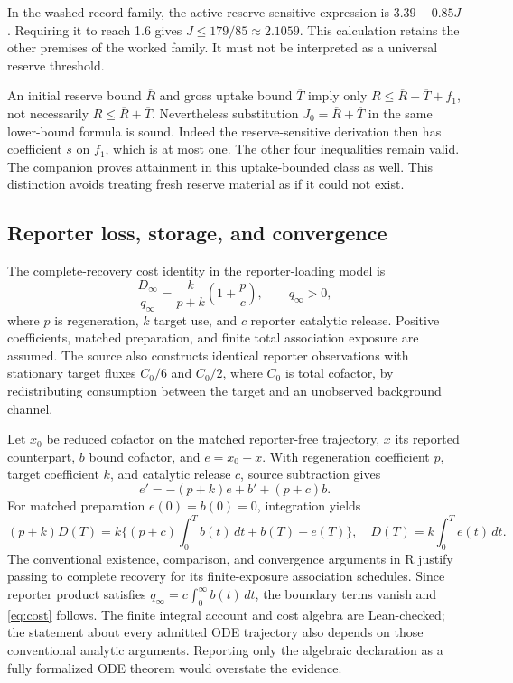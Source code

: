 In the washed record family, the active reserve-sensitive expression is $3.39-0.85J$. Requiring it to reach 1.6 gives $J\le179/85\approx2.1059$. This calculation retains the other premises of the worked family. It must not be interpreted as a universal reserve threshold.

An initial reserve bound $\overline R$ and gross uptake bound $\overline T$ imply only $R\le\overline R+\overline T+f_1$, not necessarily $R\le\overline R+\overline T$. Nevertheless substitution $J_0=\overline R+\overline T$ in the same lower-bound formula is sound. Indeed the reserve-sensitive derivation then has coefficient $s$ on $f_1$, which is at most one. The other four inequalities remain valid. The companion proves attainment in this uptake-bounded class as well. This distinction avoids treating fresh reserve material as if it could not exist.

\subsection{Reporter loss, storage, and convergence}\label{app:reporter}
The complete-recovery cost identity in the reporter-loading model is
\begin{equation}\label{eq:cost}
\frac{D_\infty}{q_\infty}=\frac{k}{p+k}\left(1+\frac{p}{c}\right),\qquad q_\infty>0,
\end{equation}
where $p$ is regeneration, $k$ target use, and $c$ reporter catalytic release. Positive coefficients, matched preparation, and finite total association exposure are assumed. The source also constructs identical reporter observations with stationary target fluxes $C_0/6$ and $C_0/2$, where $C_0$ is total cofactor, by redistributing consumption between the target and an unobserved background channel.

Let $x_0$ be reduced cofactor on the matched reporter-free trajectory, $x$ its reported counterpart, $b$ bound cofactor, and $e=x_0-x$. With regeneration coefficient $p$, target coefficient $k$, and catalytic release $c$, source subtraction gives
\[
e'=-(p+k)e+b'+(p+c)b.
\]
For matched preparation $e(0)=b(0)=0$, integration yields
\[
(p+k)D(T)=k\{(p+c)\int_0^T b(t)\,dt+b(T)-e(T)\},
\quad D(T)=k\int_0^T e(t)\,dt.
\]
The conventional existence, comparison, and convergence arguments in R justify passing to complete recovery for its finite-exposure association schedules. Since reporter product satisfies $q_\infty=c\int_0^\infty b(t)\,dt$, the boundary terms vanish and \eqref{eq:cost} follows. The finite integral account and cost algebra are Lean-checked; the statement about every admitted ODE trajectory also depends on those conventional analytic arguments. Reporting only the algebraic declaration as a fully formalized ODE theorem would overstate the evidence.


